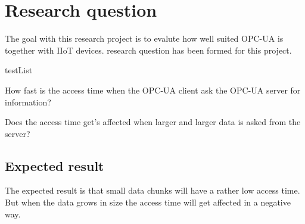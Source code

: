 \section{Research question} \label{researchQuestion}
The goal with this research project is to evalute how well suited OPC-UA is together with IIoT devices.  research question has been formed for this project.

\begin{countlist}{testList}
    \item How fast is the access time when the OPC-UA client ask the OPC-UA server for information?
    \item Does the access time get's affected when larger and larger data is asked from the server?
\end{countlist}


\subsection{Expected result}
The expected result is that small data chunks will have a rather low access time. But when the data grows in size the access time will get affected in a negative way.